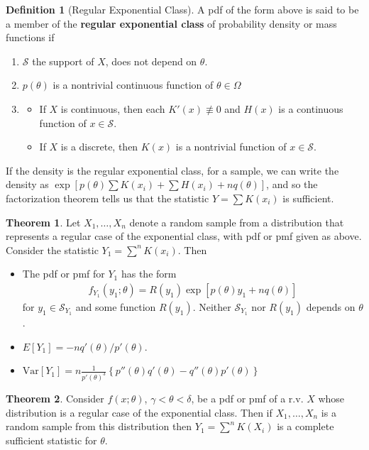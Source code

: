 \documentclass{book}
\theoremstyle{definition}
\newtheorem{defn}{Definition}[section]
\newtheorem{thm}{Theorem}[section]
\newcommand{\Var}{\text{Var}}
\newcommand{\f}[2]{\frac{#1}{#2}}
\newcommand{\lb}{\left[}
\newcommand{\rb}{\right]}
\newcommand{\lc}{\left\{}
\newcommand{\rc}{\right\}}
\begin{document}
\begin{defn}[Regular Exponential Class] 
	A pdf of the form above is said to be a member of the \textbf{regular exponential class} of probability density or mass functions if 
	\begin{enumerate}
		\item $\mathcal{S}$ the support of $X$, does not depend on $\theta$.
		
		\item $p(\theta)$ is a nontrivial continuous function of $\theta \in \Omega$
		
		\item 
		\begin{itemize}
			\item If $X$ is continuous, then each $K'(x) \not\equiv 0$ and $H(x)$ is a continuous function of $x\in \mathcal{S}$.
			
			\item If $X$ is a discrete, then $K(x)$ is a nontrivial function of $x\in \mathcal{S}$.
		\end{itemize}
	\end{enumerate}
\end{defn}

If the density is the regular exponential class, for a sample, we can write the density as $\exp\lb p(\theta)\sum K(x_i) + \sum H(x_i) + nq(\theta) \rb$, and so the factorization theorem tells us that the statistic $Y = \sum K(x_i)$ is sufficient. 


\begin{thm}
	Let $X_1,\dots,X_n$ denote a random sample from a distribution
	that represents a regular case of the exponential class, with pdf or pmf given as above. Consider the statistic $Y_1 = \sum^n K(x_i)$. Then 
	\begin{itemize}
		\item The pdf or pmf for $Y_1$ has the form
		\begin{align}
		f_{Y_1}(y_1;\theta) = R(y_1)\exp\lb p(\theta)y_1 + nq(\theta) \rb
		\end{align}
		for $y_1\in \mathcal{S}_{Y_1}$ and some function $R(y_1)$. Neither $\mathcal{S}_{Y_1}$ nor $R(y_1)$ depends on $\theta$.
		\item $E[Y_1] = -nq'(\theta)/p'(\theta)$.
		\item $\Var[Y_1] = n\f{1}{p'(\theta)^3}\lc p''(\theta)q'(\theta) - q''(\theta)p'(\theta) \rc$
	\end{itemize}
\end{thm}


\begin{thm}
	Consider $f(x;\theta)$, $\gamma < \theta < \delta$, be a pdf or pmf of a r.v. $X$ whose distribution is a regular case of the exponential class. Then if $X_1,\dots,X_n$ is a random sample from this distribution then $Y_1 = \sum^n K(X_i)$ is a complete sufficient statistic for $\theta$. 
\end{thm}
\end{document}

